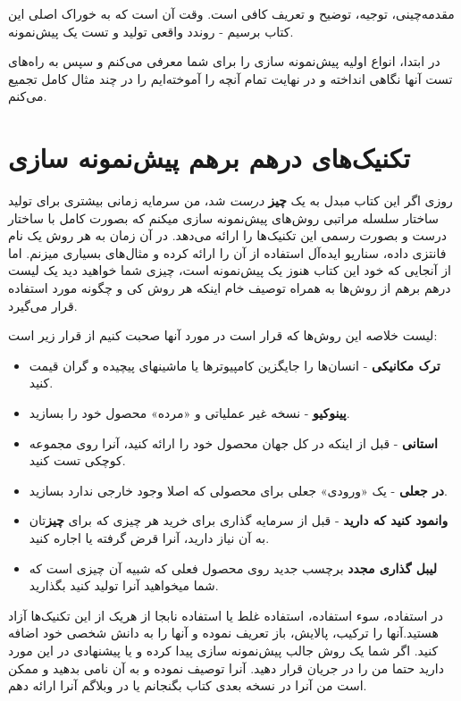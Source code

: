 مقدمه‌چینی، توجیه، توضیح و تعریف کافی است. وقت آن است که به خوراک اصلی
این کتاب برسیم - روندد واقعی تولید و تست یک پیش‌نمونه.

در ابتدا، انواع اولیه پیش‌نمونه سازی را برای شما معرفی می‌کنم و سپس به
راه‌های تست آنها نگاهی انداخته و در نهایت تمام آنچه را آموخته‌ایم را در
چند مثال کامل تجمیع می‌کنم.

\section{تکنیک‌های درهم برهم پیش‌نمونه
سازی}\label{ux62aux6a9ux646ux6ccux6a9ux647ux627ux6cc-ux62fux631ux647ux645-ux628ux631ux647ux645-ux67eux6ccux634ux646ux645ux648ux646ux647-ux633ux627ux632ux6cc}

روزی اگر این کتاب مبدل به یک \textbf{چیز} \emph{درست} شد، من سرمایه
زمانی بیشتری برای تولید ساختار سلسله مراتبی روش‌های پیش‌نمونه سازی میکنم
که بصورت کامل با ساختار درست و بصورت رسمی این تکنیک‌ها را ارائه می‌دهد.
در آن زمان به هر روش یک نام فانتزی داده، سناریو ایده‌آل استفاده از آن را
ارائه کرده و مثال‌های بسیاری میزنم. اما از آنجایی که خود این کتاب هنوز
یک پیش‌نمونه است، چیزی شما خواهید دید یک لیست درهم برهم از روش‌ها به
همراه توصیف خام اینکه هر روش کی و چگونه مورد استفاده قرار می‌گیرد.

لیست خلاصه این روش‌ها که قرار است در مورد آنها صحبت کنیم از قرار زیر
است:

\begin{itemize}
\item
  \textbf{ترک مکانیکی} - انسان‌ها را جایگزین کامپیوترها یا ماشینهای
  پیچیده و گران قیمت کنید.
\item
  \textbf{پینوکیو} - نسخه غیر عملیاتی و «مرده» محصول خود را بسازید.
\item
  \textbf{استانی} - قبل از اینکه در کل جهان محصول خود را ارائه کنید،
  آنرا روی مجموعه کوچکی تست کنید.
\item
  \textbf{در جعلی} - یک «ورودی» جعلی برای محصولی که اصلا وجود خارجی
  ندارد بسازید.
\item
  \textbf{وانمود کنید که دارید} - قبل از سرمایه گذاری برای خرید هر چیزی
  که برای \textbf{چیز}تان به آن نیاز دارید، آنرا قرض گرفته یا اجاره
  کنید.
\item
  \textbf{لیبل گذاری مجدد} برچسب جدید روی محصول فعلی که شبیه آن چیزی است
  که شما میخواهید آنرا تولید کنید بگذارید.
\end{itemize}

در استفاده، سوء استفاده، استفاده غلط یا استفاده نابجا از هریک از این
تکنیک‌ها آزاد هستید.آنها را ترکیب، پالایش، باز تعریف نموده و آنها را به
دانش شخصی خود اضافه کنید. اگر شما یک روش جالب پیش‌نمونه سازی پیدا کرده و
یا پیشنهادی در این مورد دارید حتما من را در جریان قرار دهید. آنرا توصیف
نموده و به آن نامی بدهید و ممکن است من آنرا در نسخه بعدی کتاب بگنجانم یا
در وبلاگم آنرا ارائه دهم.

